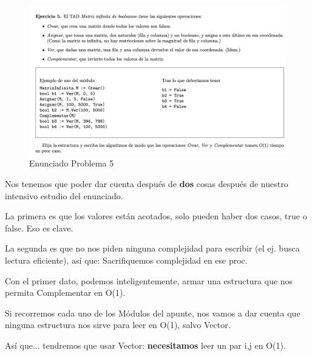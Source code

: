 \documentclass[10pt,a4paper]{article}
\begin{document}
\newpage


\begin{figure}[h]
  \centering
  \includegraphics[width=\textwidth]{images/guia_8_ej_5.png}
  \caption{Enunciado Problema 5}
  \label{fig:ej_5}
\end{figure}

\par Nos tenemos que poder dar cuenta después de \textbf{dos} cosas después de nuestro intensivo estudio del enunciado.
\par La primera es que los valores están acotados, solo pueden haber dos casos, true o false. Eso es clave.
\par La segunda es que no nos piden ninguna complejidad para escribir (el ej. busca lectura eficiente), así que: Sacrifiquemos complejidad en ese proc.
\par Con el primer dato, podemos inteligentemente, armar una estructura que nos permita Complementar en O(1).
\par Si recorremos cada uno de los Módulos del apunte, nos vamos a dar cuenta que ninguna estructura nos sirve para leer en O(1), salvo Vector.
\par Así que... tendremos que usar Vector: \textbf{necesitamos} leer un par i,j en O(1).
\end{document}
